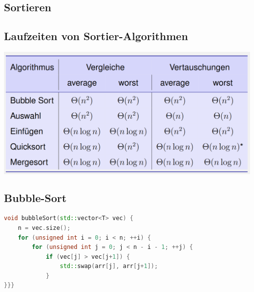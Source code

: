 \vspace{-4pt}
\begin{sectionbox}
\section{Sortieren}
\subsection{Laufzeiten von Sortier-Algorithmen}\smallskip
\begin{center}
    \includegraphics[width = \columnwidth]{../img/LaufzeitenSort.png}
\end{center}
\end{sectionbox}
\vspace{-4pt}
\begin{sectionbox}
\subsection{Bubble-Sort}
\begin{lstlisting}[language=C++]
void bubbleSort(std::vector<T> vec) { 
    n = vec.size();
    for (unsigned int i = 0; i < n; ++i) {
        for (unsigned int j = 0; j < n - i - 1; ++j) {
            if (vec[j] > vec[j+1]) {
                std::swap(arr[j], arr[j+1]);
            }
}}}
\end{lstlisting}\vspace{-6px}
\end{sectionbox}
\vspace{-4pt}
